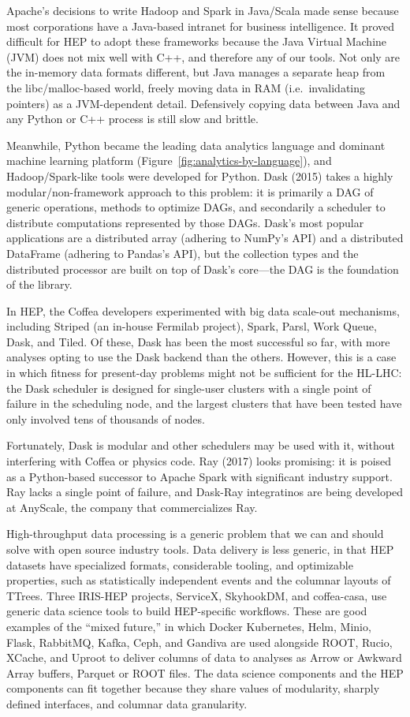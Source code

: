 \documentclass{article}
\begin{document}
Apache's decisions to write Hadoop and Spark in Java/Scala made sense because most corporations have a Java-based intranet for business intelligence. It proved difficult for HEP to adopt these frameworks because the Java Virtual Machine (JVM) does not mix well with C++, and therefore any of our tools. Not only are the in-memory data formats different, but Java manages a separate heap from the libc/malloc-based world, freely moving data in RAM (i.e.\ invalidating pointers) as a JVM-dependent detail. Defensively copying data between Java and any Python or C++ process is still slow and brittle.

Meanwhile, Python became the leading data analytics language and dominant machine learning platform (Figure~\ref{fig:analytics-by-language}), and Hadoop/Spark-like tools were developed for Python. Dask (2015) takes a highly modular/non-framework approach to this problem: it is primarily a DAG of generic operations, methods to optimize DAGs, and secondarily a scheduler to distribute computations represented by those DAGs. Dask's most popular applications are a distributed array (adhering to NumPy's API) and a distributed DataFrame (adhering to Pandas's API), but the collection types and the distributed processor are built on top of Dask's core---the DAG is the foundation of the library.

In HEP, the Coffea developers experimented with big data scale-out mechanisms, including Striped (an in-house Fermilab project), Spark, Parsl, Work Queue, Dask, and Tiled. Of these, Dask has been the most successful so far, with more analyses opting to use the Dask backend than the others. However, this is a case in which fitness for present-day problems might not be sufficient for the HL-LHC: the Dask scheduler is designed for single-user clusters with a single point of failure in the scheduling node, and the largest clusters that have been tested have only involved tens of thousands of nodes.

Fortunately, Dask is modular and other schedulers may be used with it, without interfering with Coffea or physics code. Ray (2017) looks promising: it is poised as a Python-based successor to Apache Spark with significant industry support. Ray lacks a single point of failure, and Dask-Ray integratinos are being developed at AnyScale, the company that commercializes Ray.

High-throughput data processing is a generic problem that we can and should solve with open source industry tools. Data delivery is less generic, in that HEP datasets have specialized formats, considerable tooling, and optimizable properties, such as statistically independent events and the columnar layouts of TTrees. Three IRIS-HEP projects, ServiceX, SkyhookDM, and coffea-casa, use generic data science tools to build HEP-specific workflows. These are good examples of the ``mixed future,'' in which Docker Kubernetes, Helm, Minio, Flask, RabbitMQ, Kafka, Ceph, and Gandiva are used alongside ROOT, Rucio, XCache, and Uproot to deliver columns of data to analyses as Arrow or Awkward Array buffers, Parquet or ROOT files. The data science components and the HEP components can fit together because they share values of modularity, sharply defined interfaces, and columnar data granularity.
\end{document}
